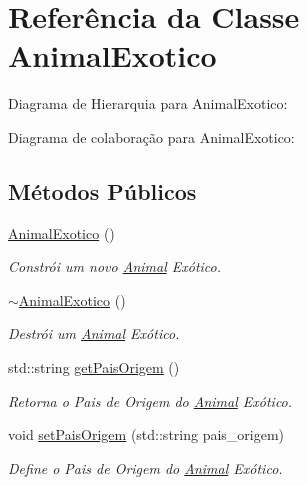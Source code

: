 \hypertarget{classAnimalExotico}{}\section{Referência da Classe Animal\+Exotico}
\label{classAnimalExotico}


Diagrama de Hierarquia para Animal\+Exotico\+:


Diagrama de colaboração para Animal\+Exotico\+:
\subsection*{Métodos Públicos}
\begin{DoxyCompactItemize}
\item 
\mbox{\label{classAnimalExotico_a7e24b8ba0b4a2a8675f20e12fe0efc21}} 
\hyperlink{classAnimalExotico_a7e24b8ba0b4a2a8675f20e12fe0efc21}{Animal\+Exotico} ()
\begin{DoxyCompactList}\small\item\em Constrói um novo \hyperlink{classAnimal}{Animal} Exótico. \end{DoxyCompactList}\item 
\mbox{\label{classAnimalExotico_a3bce432a5e14f93e6d5254ce86075d36}} 
\hyperlink{classAnimalExotico_a3bce432a5e14f93e6d5254ce86075d36}{$\sim$\+Animal\+Exotico} ()
\begin{DoxyCompactList}\small\item\em Destrói um \hyperlink{classAnimal}{Animal} Exótico. \end{DoxyCompactList}\item 
std\+::string \hyperlink{classAnimalExotico_a656238e3c9891fb2f596fe2d022e1abf}{get\+Pais\+Origem} ()
\begin{DoxyCompactList}\small\item\em Retorna o Pais de Origem do \hyperlink{classAnimal}{Animal} Exótico. \end{DoxyCompactList}\item 
void \hyperlink{classAnimalExotico_a2077371fdd8e779a42451a9183d14c63}{set\+Pais\+Origem} (std\+::string pais\+\_\+origem)
\begin{DoxyCompactList}\small\item\em Define o Pais de Origem do \hyperlink{classAnimal}{Animal} Exótico. \end{DoxyCompactList}\item 

\end{DoxyCompactItemize}
